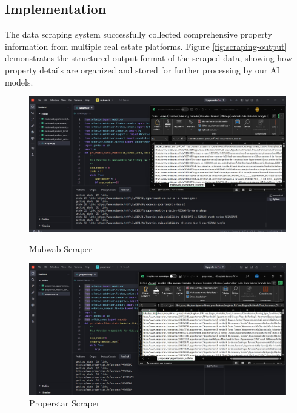 \subsection{Implementation}
The data scraping system successfully collected comprehensive property information from multiple real estate platforms. Figure \ref{fig:scraping-output} demonstrates the structured output format of the scraped data, showing how property details are organized and stored for further processing by our AI models.
\newpage
\begin{figure}[htbp]
    \centering
    \begin{minipage}{0.45\textwidth}
        \centering
        \includegraphics[width=\linewidth]{images/mubwab_scraper.jpeg}
        \caption*{Mubwab Scraper}
    \end{minipage}
    \hfill
    \begin{minipage}{0.45\textwidth}
        \centering
        \includegraphics[width=\linewidth]{images/properstar_scraper.jpeg}
        \caption*{Properstar Scraper}
    \end{minipage}
    
    \vspace{1cm}
    

\end{figure}
